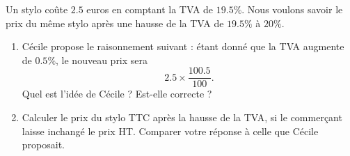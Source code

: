 
\begin{exercice}\label{exosmath-0136}

    Un stylo coûte \( 2.5\) euros en comptant la TVA de \( 19.5\%\). Nous voulons savoir le prix du même stylo après une hausse de la TVA de \( 19.5\%\) à \( 20\%\).
    \begin{enumerate}
        \item
            Cécile propose le raisonnement suivant : étant donné que la TVA augmente de \( 0.5\%\), le nouveau prix sera
            \begin{equation}
                2.5\times\frac{ 100.5 }{ 100 }.
            \end{equation}
            Quel est l'idée de Cécile ? Est-elle correcte ?
        \item
            Calculer le prix du stylo TTC après la hausse de la TVA, si le commerçant laisse inchangé le prix HT. Comparer votre réponse à celle que Cécile proposait.
    \end{enumerate}

\end{exercice}
